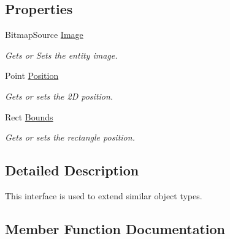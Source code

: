 \subsection*{Properties}
\begin{DoxyCompactItemize}
\item 
Bitmap\+Source \mbox{\hyperlink{interface_o_e_invaders_1_1_library_1_1_i_entity_a61764ef4e791af7a07843cfe1edddbc7}{Image}}
\begin{DoxyCompactList}\small\item\em Gets or Sets the entity image. \end{DoxyCompactList}\item 
Point \mbox{\hyperlink{interface_o_e_invaders_1_1_library_1_1_i_entity_ab92400fe8382c46f229b50eaaef8ed67}{Position}}
\begin{DoxyCompactList}\small\item\em Gets or sets the 2D position. \end{DoxyCompactList}\item 
Rect \mbox{\hyperlink{interface_o_e_invaders_1_1_library_1_1_i_entity_ae2469de47f2a42a16908c13b65293d96}{Bounds}}
\begin{DoxyCompactList}\small\item\em Gets or sets the rectangle position. \end{DoxyCompactList}\end{DoxyCompactItemize}


\subsection{Detailed Description}
This interface is used to extend similar object types. 



\subsection{Member Function Documentation}
\mbox{\label{interface_o_e_invaders_1_1_library_1_1_i_entity_ae2cf61539ba662a6793fef01abcad2ef}} 
